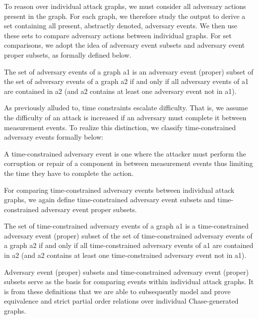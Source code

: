 \documentclass[runningheads]{llncs}
\theoremstyle{definition}
\begin{document}
\noindent To reason over individual attack graphs, we must consider all adversary actions present in the graph. For each graph, we therefore study the output to derive a set containing all present, abstractly denoted, adversary events. We then use these sets to compare adversary actions between individual graphs. For set comparisons, we adopt the idea of adversary event subsets and adversary event proper subsets, as formally defined below. 

\begin{definition}
    The set of adversary events of a graph a1 is an adversary event (proper) subset of the set of adversary events of a graph a2 if and only if all adversary events of a1 are contained in a2 (and a2 contains at least one adversary event not in a1).
 \end{definition}

As previously alluded to, time constraints escalate difficulty. That is, we assume the difficulty of an attack is increased if an adversary must complete it between measurement events. To realize this distinction, we classify time-constrained adversary events formally below:  

\begin{definition}
    A time-constrained adversary event is one where the attacker must perform the corruption or repair of a component in between measurement events thus limiting the time they have to complete the action.  
\end{definition}

\noindent For comparing time-constrained adversary events between individual attack graphs, we again define time-constrained adversary event subsets and time-constrained adversary event proper subsets.
 
 \begin{definition}   
    The set of time-constrained adversary events of a graph a1 is a time-constrained adversary event (proper) subset of the set of time-constrained adversary events of a graph a2 if and only if all time-constrained adversary events of a1 are contained in a2 (and a2 contains at least one time-constrained adversary event not in a1).
 \end{definition}

Adversary event (proper) subsets and time-constrained adversary event (proper) subsets serve as the basis for comparing events within individual attack graphs. It is from these definitions that we are able to subsequently model and prove equivalence and strict partial order relations over individual Chase-generated graphs. 
\end{document}
